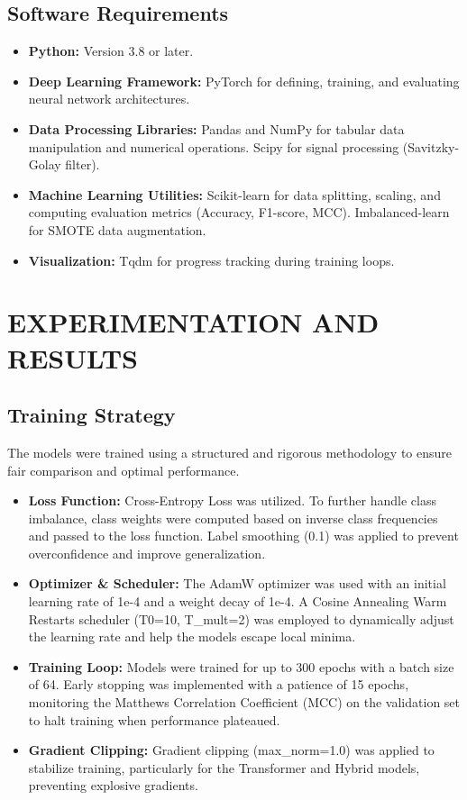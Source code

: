 \documentclass[ 12pt,a4paper,twocolumn,fleqn]{report}
\begin{document}
\section{Software Requirements}
\vspace{2mm}
\begin{itemize}
    \item \textbf{Python:} Version 3.8 or later.
    \item \textbf{Deep Learning Framework:} PyTorch for defining, training, and evaluating neural network architectures.
    \item \textbf{Data Processing Libraries:} Pandas and NumPy for tabular data manipulation and numerical operations. Scipy for signal processing (Savitzky-Golay filter).
    \item \textbf{Machine Learning Utilities:} Scikit-learn for data splitting, scaling, and computing evaluation metrics (Accuracy, F1-score, MCC). Imbalanced-learn for SMOTE data augmentation.
    \item \textbf{Visualization:} Tqdm for progress tracking during training loops.
\end{itemize}

\newpage
  \pagestyle{fancy}

\normalsize
\chapter{EXPERIMENTATION AND RESULTS}
\section{Training Strategy}
\vspace{2mm}
The models were trained using a structured and rigorous methodology to ensure fair comparison and optimal performance.
\begin{itemize}
    \item \textbf{Loss Function:} Cross-Entropy Loss was utilized. To further handle class imbalance, class weights were computed based on inverse class frequencies and passed to the loss function. Label smoothing (0.1) was applied to prevent overconfidence and improve generalization.
    \item \textbf{Optimizer \& Scheduler:} The AdamW optimizer was used with an initial learning rate of 1e-4 and a weight decay of 1e-4. A Cosine Annealing Warm Restarts scheduler (T0=10, T\_mult=2) was employed to dynamically adjust the learning rate and help the models escape local minima.
    \item \textbf{Training Loop:} Models were trained for up to 300 epochs with a batch size of 64. Early stopping was implemented with a patience of 15 epochs, monitoring the Matthews Correlation Coefficient (MCC) on the validation set to halt training when performance plateaued.
    \item \textbf{Gradient Clipping:} Gradient clipping (max\_norm=1.0) was applied to stabilize training, particularly for the Transformer and Hybrid models, preventing explosive gradients.
\end{itemize}
\end{document}
